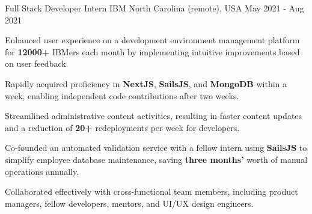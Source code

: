 \begin{cventries}
    \cventry
    {Full Stack Developer Intern} %
    {IBM} %
    {North Carolina (remote), USA} %
    {May 2021 - Aug 2021} %
    {
      \begin{cvitems} %
        \item {Enhanced user experience on a development environment management platform for \textbf{12000+} IBMers each month by implementing intuitive improvements based on user feedback.}
        \item {Rapidly acquired proficiency in  \textbf{NextJS}, \textbf{SailsJS}, and \textbf{MongoDB} within a week, enabling independent code contributions after two weeks.}
        \item {Streamlined administrative content activities, resulting in faster content updates and a reduction of \textbf{20+} redeployments per week for developers.}
        \item {Co-founded an automated validation service with a fellow intern using \textbf{SailsJS} to simplify employee database maintenance, saving \textbf{three months'} worth of manual operations annually.}
        \item {Collaborated effectively with cross-functional team members, including product managers, fellow developers, mentors, and UI/UX design engineers.}
      \end{cvitems}
    }



\end{cventries}

